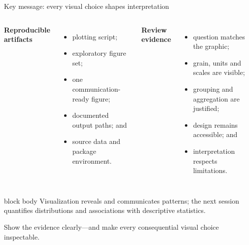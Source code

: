\documentclass[10pt,aspectratio=169]{beamer}
\begin{document}
\begin{frame}{Key message: every visual choice shapes interpretation}

\small

\begin{columns}[T]


\textbf{Reproducible artifacts}

\begin{itemize}
  \item plotting script;
  \item exploratory figure set;
  \item one communication-ready figure;
  \item documented output paths; and
  \item source data and package environment.
\end{itemize}


\textbf{Review evidence}

\begin{itemize}
  \item question matches the graphic;
  \item grain, units and scales are visible;
  \item grouping and aggregation are justified;
  \item design remains accessible; and
  \item interpretation respects limitations.
\end{itemize}

\end{columns}

\vspace{0.35cm}

\begin{beamercolorbox}[rounded=true,sep=8pt]{block body}
Visualization reveals and communicates patterns; the next session quantifies distributions and associations with descriptive statistics.
\end{beamercolorbox}

\vspace{0.18cm}

\centering
\textcolor{ukudlaRed}{Show the evidence clearly---and make every consequential visual choice inspectable.}

\end{frame}
\end{document}
